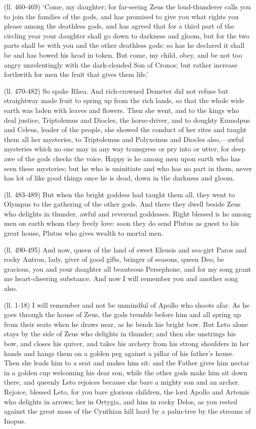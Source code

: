 (ll. 460-469) ‘Come, my daughter; for far-seeing Zeus the loud-thunderer
calls you to join the families of the gods, and has promised to give you what
rights you please among the deathless gods, and has agreed that for a third
part of the circling year your daughter shall go down to darkness and gloom,
but for the two parts shall be with you and the other deathless gods: so has he
declared it shall be and has bowed his head in token. But come, my child, obey,
and be not too angry unrelentingly with the dark-clouded Son of Cronos; but
rather increase forthwith for men the fruit that gives them life.’

(ll. 470-482) So spake Rhea. And rich-crowned Demeter did not refuse but
straightway made fruit to spring up from the rich lands, so that the whole wide
earth was laden with leaves and flowers. Then she went, and to the kings who
deal justice, Triptolemus and Diocles, the horse-driver, and to doughty
Eumolpus and Celeus, leader of the people, she showed the conduct of her rites
and taught them all her mysteries, to Triptolemus and Polyxeinus and Diocles
also,—awful mysteries which no one may in any way transgress or pry into
or utter, for deep awe of the gods checks the voice. Happy is he among men upon
earth who has seen these mysteries; but he who is uninitiate and who has no
part in them, never has lot of like good things once he is dead, down in the
darkness and gloom.

(ll. 483-489) But when the bright goddess had taught them all, they went to
Olympus to the gathering of the other gods. And there they dwell beside Zeus
who delights in thunder, awful and reverend goddesses. Right blessed is he
among men on earth whom they freely love: soon they do send Plutus as guest to
his great house, Plutus who gives wealth to mortal men.

(ll. 490-495) And now, queen of the land of sweet Eleusis and sea-girt Paros
and rocky Antron, lady, giver of good gifts, bringer of seasons, queen Deo, be
gracious, you and your daughter all beauteous Persephone, and for my song grant
me heart-cheering substance. And now I will remember you and another song also.


(ll. 1-18) I will remember and not be unmindful of Apollo who shoots afar. As
he goes through the house of Zeus, the gods tremble before him and all spring
up from their seats when he draws near, as he bends his bright bow. But Leto
alone stays by the side of Zeus who delights in thunder; and then she unstrings
his bow, and closes his quiver, and takes his archery from his strong shoulders
in her hands and hangs them on a golden peg against a pillar of his
father’s house. Then she leads him to a seat and makes him sit: and the
Father gives him nectar in a golden cup welcoming his dear son, while the other
gods make him sit down there, and queenly Leto rejoices because she bare a
mighty son and an archer. Rejoice, blessed Leto, for you bare glorious
children, the lord Apollo and Artemis who delights in arrows; her in Ortygia,
and him in rocky Delos, as you rested against the great mass of the Cynthian
hill hard by a palm-tree by the streams of Inopus.

